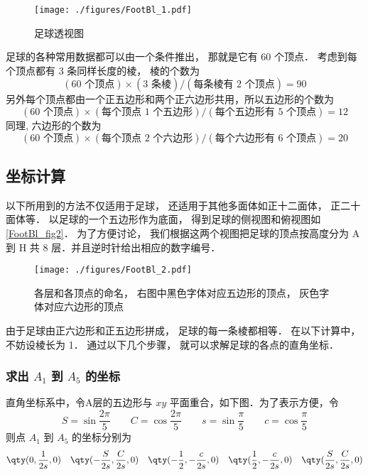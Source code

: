 


\begin{figure}[ht]
\centering
\texttt{[image: ./figures/FootBl\_1.pdf]}
\caption{足球透视图} \label{FootBl_fig1}
\end{figure}

足球的各种常用数据都可以由一个条件推出， 那就是它有 60 个顶点． 考虑到每个顶点都有 3 条同样长度的棱， 棱的个数为
\begin{equation}
(\text{60 个顶点}) \times (\text{3 条棱}) / (\text{每条棱有 2 个顶点}) = 90
\end{equation}
另外每个顶点都由一个正五边形和两个正六边形共用，所以五边形的个数为
\begin{equation}
(\text{60 个顶点}) \times (\text{每个顶点 1 个五边形}) / (\text{每个五边形有 5 个顶点}) = 12
\end{equation}
同理, 六边形的个数为
\begin{equation}
(\text{60 个顶点}) \times (\text{每个顶点 2 个六边形}) / (\text{每个六边形有 6 个顶点}) = 20
\end{equation}

\subsection{坐标计算}
以下所用到的方法不仅适用于足球， 还适用于其他多面体如正十二面体， 正二十面体等． 以足球的一个五边形作为底面， 得到足球的侧视图和俯视图如\autoref{FootBl_fig2}． 为了方便讨论， 我们根据这两个视图把足球的顶点按高度分为 A 到 H 共 8 层．并且逆时针给出相应的数字编号．

\begin{figure}[ht]
\centering
\texttt{[image: ./figures/FootBl\_2.pdf]}
\caption{各层和各顶点的命名， 右图中黑色字体对应五边形的顶点， 灰色字体对应六边形的顶点} \label{FootBl_fig2}
\end{figure}

由于足球由正六边形和正五边形拼成， 足球的每一条棱都相等． 在以下计算中， 不妨设棱长为 1． 通过以下几个步骤， 就可以求解足球的各点的直角坐标．

\subsubsection{求出 $A_1$ 到 $A_5$ 的坐标}
直角坐标系中，令A层的五边形与 $xy$ 平面重合，如下图．为了表示方便，令
\begin{equation}
S = \sin\frac{2\pi}{5} \qquad
C = \cos\frac{2\pi}{5} \qquad
s = \sin\frac{\pi}{5} \qquad
c = \cos\frac{\pi}{5}
\end{equation}
则点 $A_1$ 到 $A_5$ 的坐标分别为
\begin{equation}\label{FootBl_eq5}
\qty(0, \frac{1}{2s}, 0) \quad
\qty(-\frac{S}{2s}, \frac{C}{2s}, 0) \quad
\qty(-\frac12, -\frac{c}{2s}, 0) \quad
\qty(\frac12, -\frac{c}{2s}, 0) \quad
\qty(\frac{S}{2s}, \frac{C}{2s}, 0)
\end{equation}

